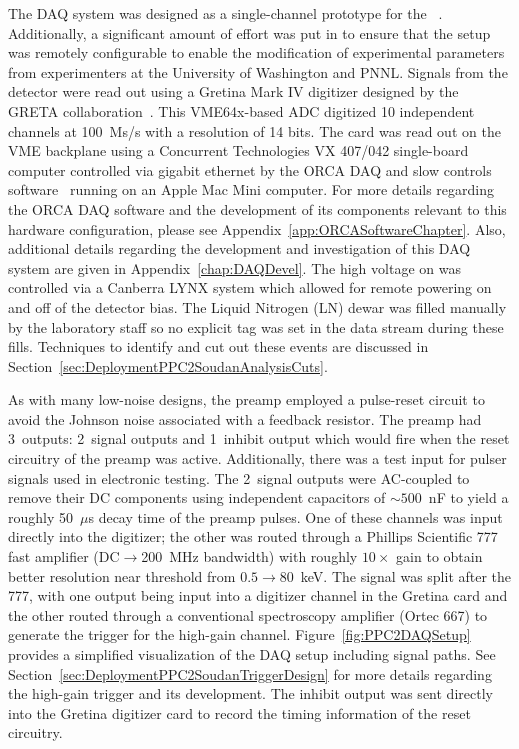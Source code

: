 	The DAQ system was designed as a single-channel prototype for the \MJ~\minmod.  Additionally, a significant amount of effort was put in to ensure that the setup was remotely configurable to enable the modification of experimental parameters from experimenters at the University of Washington and PNNL.  Signals from the detector were read out using a Gretina Mark IV digitizer designed by the GRETA collaboration~\cite{Anderson:2009p1293}.  This VME64x-based ADC digitized 10 independent channels at 100~Ms/s with a resolution of 14 bits.  The card was read out on the VME backplane using a Concurrent Technologies VX 407/042 single-board computer controlled via gigabit ethernet by the ORCA DAQ and slow controls software~\cite{ORCA} running on an Apple Mac Mini computer.  For more details regarding the ORCA DAQ software and the development of its components relevant to this hardware configuration, please see Appendix~\ref{app:ORCASoftwareChapter}.  Also, additional details regarding the development and investigation of this DAQ system are given in Appendix~\ref{chap:DAQDevel}. The high voltage on  was controlled via a Canberra LYNX system which allowed for remote powering on and off of the detector bias.  The Liquid Nitrogen (LN) dewar was filled manually by the laboratory staff so no explicit tag was set in the data stream during these fills.  Techniques to identify and cut out these events are discussed in Section~\ref{sec:DeploymentPPC2SoudanAnalysisCuts}.
	    
	As with many low-noise designs, the  preamp employed a pulse-reset circuit to avoid the Johnson noise associated with a feedback resistor.  The preamp had 3~outputs: 2~signal outputs and 1~inhibit output which would fire when the reset circuitry of the preamp was active.  Additionally, there was a test input for pulser signals used in electronic testing.  The 2~signal outputs were AC-coupled to remove their DC components using independent capacitors of $\sim500$~nF to yield a roughly 50~$\mu$s decay time of the preamp pulses.  One of these channels was input directly into the digitizer; the other was routed through a Phillips Scientific 777 fast amplifier (DC$\to$200~MHz bandwidth) with roughly $10\times$ gain to obtain better resolution near threshold from $0.5\to80$~keV.  The signal was split after the 777, with one output being input into a digitizer channel in the Gretina card and the other routed through a conventional spectroscopy amplifier (Ortec 667) to generate the trigger for the high-gain channel.  Figure~\ref{fig:PPC2DAQSetup} provides a simplified visualization of the DAQ setup including signal paths.  See Section~\ref{sec:DeploymentPPC2SoudanTriggerDesign} for more details regarding the high-gain trigger and its development.  The inhibit output was sent directly into the Gretina digitizer card to record the timing information of the reset circuitry.
	
